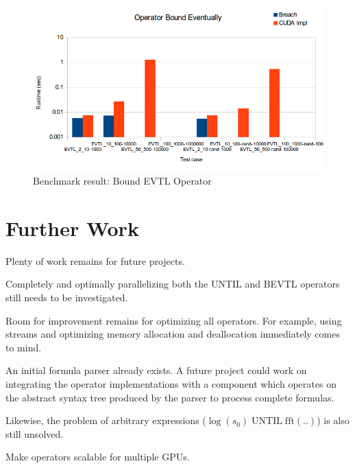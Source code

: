 \documentclass[a4paper,10pt]{article}
\begin{document}
\begin{figure}[H]
    \includegraphics[scale=0.4]{bm_bevtl.png}
    \caption{
        \label{fig:bm_bevtl}
        Benchmark result: Bound EVTL Operator}
\end{figure}

\section{Further Work}

Plenty of work remains for future projects.

Completely and optimally parallelizing both the UNTIL and BEVTL operators still needs
to be investigated.

Room for improvement remains for optimizing all operators. For example, using streams
and optimizing memory allocation and deallocation immediately comes to mind.

An initial formula parser already exists. A future project could work on integrating the operator implementations with a component which operates on the abstract syntax tree produced by the parser to process complete formulas.

Likewise, the problem of arbitrary expressions ($\log(s_0) \; \text{UNTIL} \; \text{fft}(..)$) is also still unsolved.

Make operators scalable for multiple GPUs.
\end{document}
